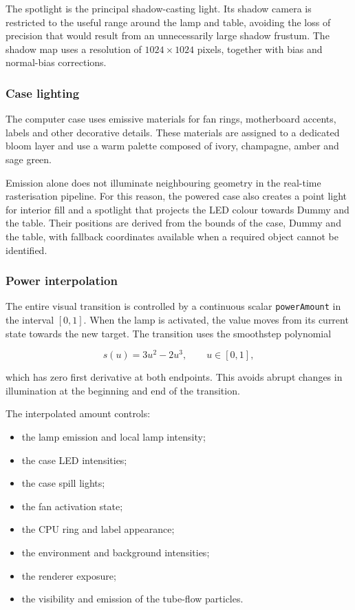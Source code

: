 \documentclass{report}
\begin{document}
The spotlight is the principal shadow-casting light. Its shadow camera
is restricted to the useful range around the lamp and table, avoiding
the loss of precision that would result from an unnecessarily large
shadow frustum. The shadow map uses a resolution of \(1024 \times 1024\)
pixels, together with bias and normal-bias corrections.

\subsubsection{Case lighting}

The computer case uses emissive materials for fan rings, motherboard
accents, labels and other decorative details. These materials are
assigned to a dedicated bloom layer and use a warm palette composed of
ivory, champagne, amber and sage green.

Emission alone does not illuminate neighbouring geometry in the
real-time rasterisation pipeline. For this reason, the powered case also
creates a point light for interior fill and a spotlight that projects
the LED colour towards Dummy and the table. Their positions are derived
from the bounds of the case, Dummy and the table, with fallback
coordinates available when a required object cannot be identified.

\subsubsection{Power interpolation}

The entire visual transition is controlled by a continuous scalar
\texttt{powerAmount} in the interval \([0,1]\). When the lamp is
activated, the value moves from its current state towards the new
target. The transition uses the smoothstep polynomial

\[
s(u)=3u^{2}-2u^{3},
\qquad
u \in [0,1],
\]

which has zero first derivative at both endpoints. This avoids abrupt
changes in illumination at the beginning and end of the transition.

The interpolated amount controls:

\begin{itemize}
    \item the lamp emission and local lamp intensity;
    \item the case LED intensities;
    \item the case spill lights;
    \item the fan activation state;
    \item the CPU ring and label appearance;
    \item the environment and background intensities;
    \item the renderer exposure;
    \item the visibility and emission of the tube-flow particles.
\end{itemize}
\end{document}
